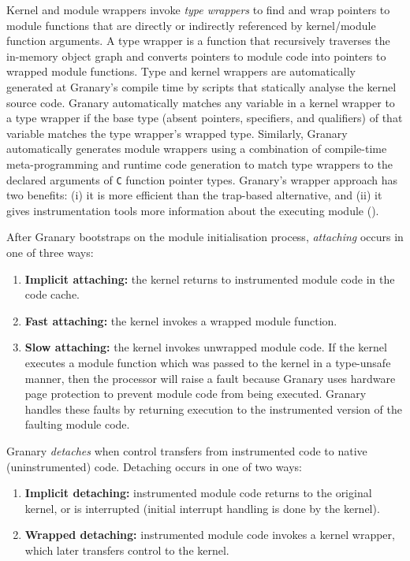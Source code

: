 \documentclass[preprint]{sigplanconf}
\begin{document}
Kernel and module wrappers invoke \emph{type wrappers} to find and wrap pointers to module functions that are directly or indirectly referenced by kernel/module function arguments. A type wrapper is a function that recursively  traverses the in-memory object graph and converts pointers to module code into pointers to wrapped module functions. Type and kernel wrappers are automatically generated at Granary's compile time by scripts that statically analyse the kernel source code. Granary automatically matches any variable in a kernel wrapper to a type wrapper if the base type (absent pointers, specifiers, and qualifiers) of that variable matches the type wrapper's wrapped type. Similarly, Granary automatically generates module wrappers using a combination of compile-time meta-programming and runtime code generation to match type wrappers to the declared arguments of \texttt{C} function pointer types.  Granary's wrapper approach has two benefits: (i) it is more efficient than the trap-based alternative, and (ii) it gives instrumentation tools more information about the executing module ().

After Granary bootstraps on the module initialisation process, \emph{attaching} occurs in one of three ways: \begin{enumerate}
	\item {\bf Implicit attaching:} the kernel returns to instrumented module code in the code cache.
	\item {\bf Fast attaching:} the kernel invokes a wrapped module function.
	\item {\bf Slow attaching:} the kernel invokes unwrapped module code. If the kernel executes a module function which was passed to the kernel in a type-unsafe manner, then the processor will raise a fault because Granary uses hardware page protection to prevent module code from being executed. Granary handles these faults by returning execution to the instrumented version of the faulting module code.
\end{enumerate}

Granary \emph{detaches} when control transfers from instrumented code to native (uninstrumented) code. Detaching occurs in one of two ways: \begin{enumerate}
	\item {\bf Implicit detaching:} instrumented module code returns to the original kernel, or is interrupted (initial interrupt handling is done by the kernel).
	\item {\bf Wrapped detaching:} instrumented module code invokes a kernel wrapper, which later transfers control to the kernel.
\end{enumerate}
\end{document}
